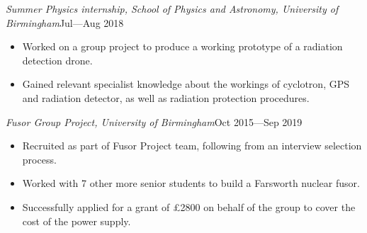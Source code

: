 \documentclass[a4paper, 12pt]{article}
\newcommand{\expentry}[3]{\emph{#1}\hfill{#2}---{#3}}
\begin{document}
\expentry{Summer Physics internship, School of Physics and Astronomy, University of Birmingham}{Jul}{Aug 2018}
    \begin{itemize}
    \setlength\itemsep{0em}
    \item Worked on a group project to produce a working prototype of a radiation detection drone.
    \item Gained relevant specialist knowledge about the workings of cyclotron, GPS and radiation detector, as well as radiation protection procedures.
    \end{itemize}
\expentry{Fusor Group Project, University of Birmingham}{Oct 2015}{Sep 2019}
    \begin{itemize}
    \setlength\itemsep{0em}
    \item Recruited as part of Fusor Project team, following from an interview selection process.
    \item Worked with 7 other more senior students to build a Farsworth nuclear fusor.
    \item Successfully applied for a grant of \pounds 2800 on behalf of the group to cover the cost of the power supply. 
    \end{itemize}
\end{document}
